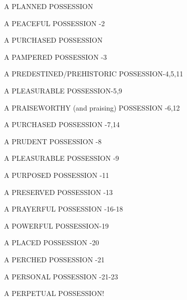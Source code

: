 \begin{compactenum}[I.][18]
    \item A PLANNED POSSESSION
    \item A PEACEFUL POSSESSION -2
    \item A PURCHASED POSSESSION
    \item A PAMPERED POSSESSION -3
    \item A PREDESTINED/PREHISTORIC POSSESSION-4,5,11
    \item A PLEASURABLE POSSESSION-5,9
    \item A PRAISEWORTHY (and praising) POSSESSION -6,12
    \item A PURCHASED POSSESSION -7,14
    \item A PRUDENT POSSESSION -8
    \item A PLEASURABLE POSSESSION -9
    \item A PURPOSED POSSESSION -11
    \item A PRESERVED POSSESSION -13
    \item A PRAYERFUL POSSESSION -16-18
    \item A POWERFUL POSSESSION-19
    \item A PLACED POSSESSION -20
    \item A PERCHED POSSESSION -21
    \item A PERSONAL POSSESSION -21-23
    \item A PERPETUAL POSSESSION!
\end{compactenum}


